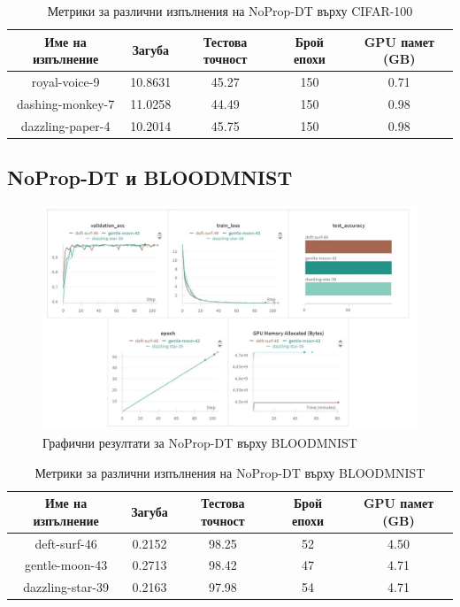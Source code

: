 \documentclass[a4paper,11pt]{article}
\begin{document}
\begin{table}[H]
  \centering
  \renewcommand{\arraystretch}{1.5} %
  \begin{tabular}{ccccc}
    \toprule
    \textbf{Име на изпълнение} & \textbf{Загуба} & \textbf{Тестова точност} & \textbf{Брой епохи} & \textbf{GPU памет (GB)}\\
    \midrule
    royal-voice-9& 10.8631& 45.27& 150 & 0.71\\
    dashing-monkey-7 & 11.0258 & 44.49 & 150 & 0.98\\
    dazzling-paper-4 & 10.2014 & 45.75 & 150 & 0.98\\
    \bottomrule
  \end{tabular}
  \caption{Метрики за различни изпълнения на NoProp-DT върху CIFAR-100}
  \label{tab:avg_metrics_noprop_dt_cifar-100}
\end{table}

\subsection{NoProp-DT и BLOODMNIST}

\begin{figure}[H]
    \centering
    \includegraphics[width=6.26in,keepaspectratio]{images/NoProp-DT BLOODMNIST.jpg}
    \caption{Графични резултати за NoProp-DT върху BLOODMNIST}
\end{figure}

\begin{table}[H]
  \centering
  \renewcommand{\arraystretch}{1.5} %
  \begin{tabular}{ccccc}
    \toprule
    \textbf{Име на изпълнение} & \textbf{Загуба} & \textbf{Тестова точност} & \textbf{Брой епохи} & \textbf{GPU памет (GB)}\\
    \midrule
    deft-surf-46 & 0.2152 & 98.25 & 52 & 4.50\\
    gentle-moon-43 & 0.2713 & 98.42 & 47 & 4.71\\
    dazzling-star-39 & 0.2163 & 97.98 & 54 & 4.71\\
    \bottomrule
  \end{tabular}
  \caption{Метрики за различни изпълнения на NoProp-DT върху BLOODMNIST}
  \label{tab:avg_metrics_noprop_dt_bloodmnist}
\end{table}
\end{document}
